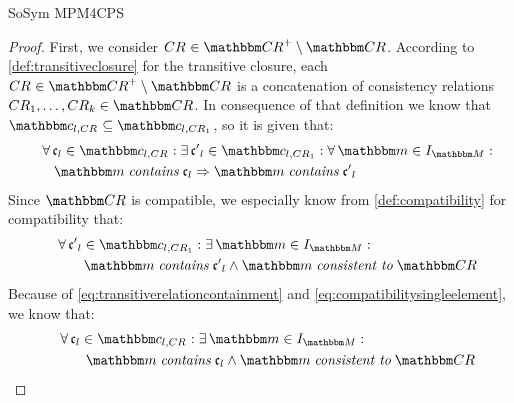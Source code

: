 \begin{copiedFrom}{SoSym MPM4CPS}
\begin{proof}
    First, we consider $\consistencyrelation{CR}{} \in \transitiveclosure{\consistencyrelationset{CR}} \setminus \consistencyrelationset{CR}$.
    According to \autoref{def:transitiveclosure} for the transitive closure, each $\consistencyrelation{CR}{} \in \transitiveclosure{\consistencyrelationset{CR}} \setminus \consistencyrelationset{CR}$ is a concatenation of consistency relations $\consistencyrelation{CR}{1}, \dots, \consistencyrelation{CR}{k} \in \consistencyrelationset{CR}$.
    In consequence of that definition we know that $\condition{c}{l,\consistencyrelation{CR}{}} \subseteq \condition{c}{l,\consistencyrelation{CR}{1}}$, so it is given that:
    \begin{align}
        \formulaskip & \nonumber \label{eq:transitiverelationcontainment}
        \forall \conditionelement{c}{l} \in \condition{c}{l,\consistencyrelation{CR}{}} : \exists \conditionelement{c'}{l} \in \condition{c}{l,\consistencyrelation{CR}{1}} : \forall \modelset{m} \in \metamodelinstances{\metamodelset{M}} : \\ 
        & \formulaskip
        \modelset{m} \containsmath \conditionelement{c}{l} \Rightarrow \modelset{m} \containsmath \conditionelement{c'}{l}
    \end{align}
    Since $\consistencyrelationset{CR}$ is compatible, we especially know from \autoref{def:compatibility} for compatibility that:
    \begin{align}
        \formulaskip & \nonumber \label{eq:compatibilitysingleelement}
        \forall \conditionelement{c'}{l} \in \condition{c}{l, \consistencyrelation{CR}{1}} %
        : \exists \modelset{m} \in \metamodelinstances{\metamodelset{M}} : \\
        & \formulaskip \formulaskip
        \modelset{m} \mathtext{contains} \conditionelement{c'}{l} \land \modelset{m} \mathtext{consistent to} \consistencyrelationset{CR}
    \end{align}
    Because of \autoref{eq:transitiverelationcontainment} and \autoref{eq:compatibilitysingleelement}, we know that:
    \begin{align}
        \formulaskip & \nonumber \label{eq:compatibilitysinglelementtransitive}
        \forall \conditionelement{c}{l} \in \condition{c}{l, \consistencyrelation{CR}{}} %
        : \exists \modelset{m} \in \metamodelinstances{\metamodelset{M}} : \\
        & \formulaskip \formulaskip
        \modelset{m} \mathtext{contains} \conditionelement{c}{l} \land \modelset{m} \mathtext{consistent to} \consistencyrelationset{CR}

\end{align}
\end{proof}
\end{copiedFrom}
